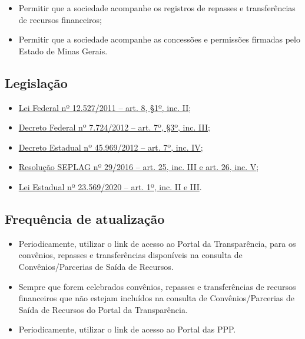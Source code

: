 \documentclass[
]{book}
\providecommand{\tightlist}{%
  \setlength{\itemsep}{0pt}\setlength{\parskip}{0pt}}
\begin{document}
\begin{itemize}
\tightlist
\item
  Permitir que a sociedade acompanhe os registros de repasses e transferências de recursos financeiros;
\item
  Permitir que a sociedade acompanhe as concessões e permissões firmadas pelo Estado de Minas Gerais.
\end{itemize}

\hypertarget{legislauxe7uxe3o-7}{%
\subsection{Legislação}\label{legislauxe7uxe3o-7}}

\begin{itemize}
\tightlist
\item
  \href{http://www.planalto.gov.br/ccivil_03/_ato2011-2014/2011/lei/l12527.htm\#art8}{Lei Federal nº 12.527/2011 -- art. 8, §1º, inc. II};
\item
  \href{http://www.planalto.gov.br/ccivil_03/_ato2011-2014/2012/decreto/d7724.htm\#art7}{Decreto Federal nº 7.724/2012 -- art. 7º, §3º, inc. III};
\item
  \href{https://www.almg.gov.br/consulte/legislacao/completa/completa.html?tipo=DEC\&num=45969\&ano=2012}{Decreto Estadual nº 45.969/2012 -- art. 7º, inc. IV};
\item
  \href{http://www.planejamento.mg.gov.br/sites/default/files/documentos/resolucao_sitios_seplag_29_de_05_07_2016_1.pdf}{Resolução SEPLAG nº 29/2016 -- art. 25, inc. III e art. 26, inc. V};
\item
  \href{https://www.almg.gov.br/consulte/legislacao/completa/completa.html?tipo=LEI\&num=23569\&comp=\&ano=2020}{Lei Estadual nº 23.569/2020 -- art. 1º, inc. II e III}.
\end{itemize}

\hypertarget{frequuxeancia-de-atualizauxe7uxe3o-6}{%
\subsection{Frequência de atualização}\label{frequuxeancia-de-atualizauxe7uxe3o-6}}

\begin{itemize}
\tightlist
\item
  Periodicamente, utilizar o link de acesso ao Portal da Transparência, para os convênios, repasses e transferências disponíveis na consulta de Convênios/Parcerias de Saída de Recursos.
\item
  Sempre que forem celebrados convênios, repasses e transferências de recursos financeiros que não estejam incluídos na consulta de Convênios/Parcerias de Saída de Recursos do Portal da Transparência.
\item
  Periodicamente, utilizar o link de acesso ao Portal das PPP.
\end{itemize}
\end{document}
